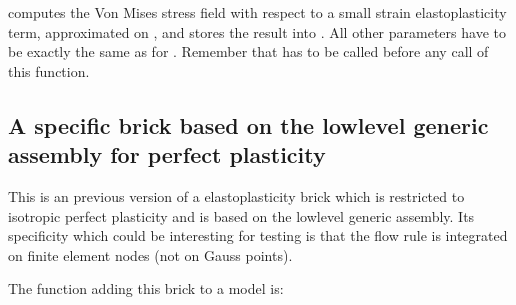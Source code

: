 \documentclass[a4paper,11pt,english]{sphinxmanual}
\begin{document}
computes the Von Mises stress field with respect to
a small strain elastoplasticity term, approximated on ,
and stores the result into .  All other parameters have to be
exactly the same as for .
Remember that  has to be called
before any call of this function.


\subsection{A specific brick based on the low\sphinxhyphen{}level generic assembly for perfect plasticity}
\label{\detokenize{userdoc/model_plasticity_small_strain:a-specific-brick-based-on-the-low-level-generic-assembly-for-perfect-plasticity}}
This is an previous version of a elastoplasticity brick which is restricted to  isotropic perfect plasticity and is based on the low\sphinxhyphen{}level generic assembly. Its specificity which could be interesting for testing is that the flow rule is integrated on  finite element nodes (not on Gauss points).

The function adding this brick to a model is:
\end{document}
